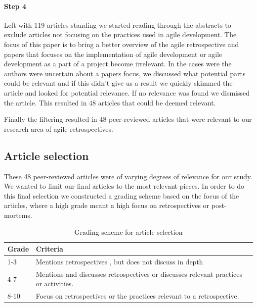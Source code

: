 \documentclass[12pt]{article}
\begin{document}
\paragraph{Step 4}
Left with 119 articles standing we started reading through the abstracts to exclude articles not focusing on the practices used in agile development. The focus of this paper is to bring a better overview of the agile retrospective and papers that focuses on the implementation of agile development or agile development as a part of a project become irrelevant. In the cases were the authors were uncertain about a papers focus, we discussed what potential parts could be relevant and if this didn't give us a result we quickly skimmed the article and looked for potential relevance. If no relevance was found we dismissed the article. This resulted in 48 articles that could be deemed relevant. 

Finally the filtering resulted in 48 peer-reviewed articles that were relevant to our research area of agile retrospectives. 

\subsection{Article selection}
These 48 peer-reviewed articles were of varying degrees of relevance for our study. We wanted to limit our final articles to the most relevant pieces. In order to do this final selection we constructed a grading scheme based on the focus of the articles, where a high grade meant a high focus on retrospectives or post-mortems. 

\begin{table}[!h]
	\centering
	\caption{Grading scheme for article selection}
	\label{table:article_grading}
	\begin{tabular}{l | p{}}
		\hline
		Grade & Criteria \\
		\hline
		1-3 & Mentions retrospectives , but does not discuss in depth \\
		4-7 & Mentions and discusses retrospectives  or discusses relevant practices or activities. \\
		8-10 & Focus on retrospectives or the practices relevant to a retrospective. \\
	\end{tabular}
\end{table}		
\end{document}
